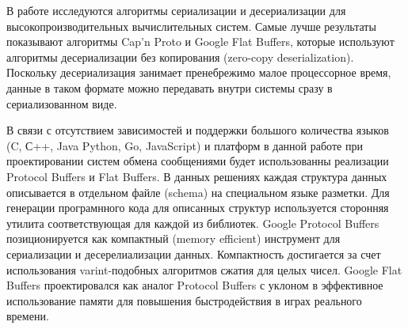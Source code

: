 В работе \cite{zaluzhnyi2016serialization} исследуются алгоритмы сериализации и десериализации для высокопроизводительных вычислительных систем. Самые лучше результаты показывают алгоритмы Cap'n Proto и Google Flat Buffers, которые используют алгоритмы десериализации без копирования (zero-copy deserialization). Поскольку десериализация занимает пренебрежимо малое процессорное время, данные в таком формате можно передавать внутри системы сразу в сериализованном виде.

В связи с отсутствием зависимостей и поддержки большого количества языков (C, С++, Java Python, Go, JavaScript) и платформ  в данной работе при проектировании систем обмена сообщениями будет использованны реализации Protocol Buffers и Flat Buffers. В данных решениях каждая структура данных описывается в отдельном файле (schema) на специальном языке разметки. Для генерации програмнного кода для описанных структур используется сторонняя утилита соответствующая для каждой из библиотек. Google Protocol Buffers позиционируется как компактный (memory efficient) инструмент для сериализации и десерелиализации данных. Компактность достигается за счет использования varint-подобных алгоритмов сжатия для целых чисел. Google Flat Buffers проектировался как аналог Protocol Buffers с уклоном в эффективное использование памяти для повышения быстродействия в играх реального времени. 

